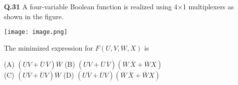 \documentclass{article}
\begin{document}
\noindent\textbf{Q.31} A four-variable Boolean function is realized using 4×1 multiplexers as shown in the figure.

\begin{center}
    \texttt{[image: image.png]}
\end{center}

\noindent The minimized expression for \( F(U, V, W, X) \) is

\begin{flushleft}
    (A) \( (UV + \overline{U}\,\overline{V})\overline{W} \) \hspace{2cm}
    (B) \( (UV + \overline{U}\,\overline{V})(\overline{W}\,\overline{X} + \overline{W}X) \) \\
    (C) \( (U\overline{V} + \overline{U}V)\overline{W} \) \hspace{2cm}
    (D) \( (U\overline{V} + \overline{U}V)(\overline{W}\,\overline{X} + \overline{W}X) \)
\end{flushleft}
\end{document}
